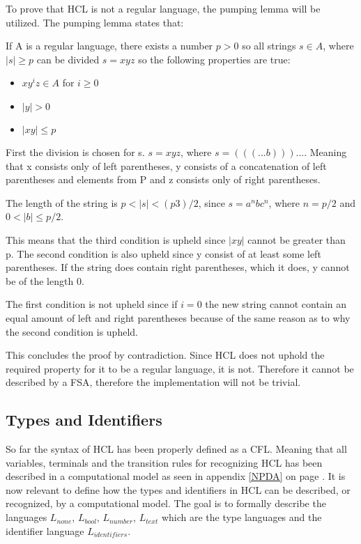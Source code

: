 To prove that HCL is not a regular language, the pumping lemma will be utilized.
The pumping lemma states that:
\begin{center}
	If A is a regular language, there exists a number $p>0$ so all strings $s \in A $, where $|s| \geq p$ can be divided $s = xyz$ so the following properties are true:
	\begin{itemize}
		\item $xy^iz \in A$ for $i \geq 0$
		\item $|y| > 0$
		\item $|xy| \leq p$
	\end{itemize}
\end{center}

First the division is chosen for s.
$s = xyz$, where $s = (((...b)))...$.
Meaning that x consists only of left parentheses, y consists of a concatenation of left parentheses and elements from P and z consists only of right parentheses.

The length of the string is $p < |s| < (p3)/2$, since $s = a^nbc^n$, where $n = p/2$ and $0 < |b| \leq p/2$.

This means that the third condition is upheld since $|xy|$ cannot be greater than p.
The second condition is also upheld since y consist of at least some left parentheses. 
If the string does contain right parentheses, which it does, y cannot be of the length 0.

The first condition is not upheld since if $i = 0$ the new string cannot contain an equal amount of left and right parentheses because of the same reason as to why the second condition is upheld.

This concludes the proof by contradiction.
Since HCL does not uphold the required property for it to be a regular language, it is not.
Therefore it cannot be described by a FSA, therefore the implementation will not be trivial.

\subsection{Types and Identifiers}
So far the syntax of HCL has been properly defined as a CFL. 
Meaning that all variables, terminals and the transition rules for recognizing HCL has been described in a computational model as seen in appendix \ref{NPDA} on page \pageref{NPDA}.
It is now relevant to define how the types and identifiers in HCL can be described, or recognized, by a computational model.
The goal is to formally describe the languages $L_{none}$, $L_{bool}$, $L_{number}$, $L_{text}$ which are the type languages and the identifier language $L_{identifiers}$.

